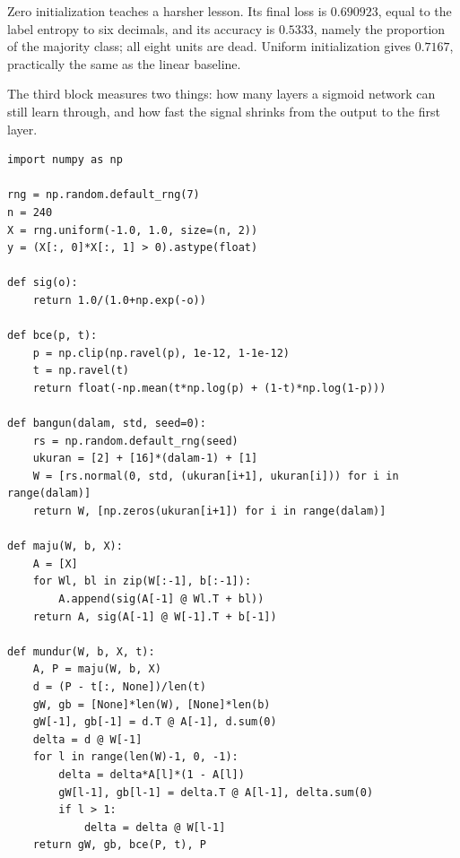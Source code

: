 Zero initialization teaches a harsher lesson. Its final loss is $0.690923$, equal to the label
entropy to six decimals, and its accuracy is $0.5333$, namely the proportion of the majority
class; all eight units are dead. Uniform initialization gives $0.7167$, practically the same as
the linear baseline.

The third block measures two things: how many layers a sigmoid network can still learn through,
and how fast the signal shrinks from the output to the first layer.

\begin{lab}
\begin{verbatim}
import numpy as np

rng = np.random.default_rng(7)
n = 240
X = rng.uniform(-1.0, 1.0, size=(n, 2))
y = (X[:, 0]*X[:, 1] > 0).astype(float)

def sig(o):
    return 1.0/(1.0+np.exp(-o))

def bce(p, t):
    p = np.clip(np.ravel(p), 1e-12, 1-1e-12)
    t = np.ravel(t)
    return float(-np.mean(t*np.log(p) + (1-t)*np.log(1-p)))

def bangun(dalam, std, seed=0):
    rs = np.random.default_rng(seed)
    ukuran = [2] + [16]*(dalam-1) + [1]
    W = [rs.normal(0, std, (ukuran[i+1], ukuran[i])) for i in range(dalam)]
    return W, [np.zeros(ukuran[i+1]) for i in range(dalam)]

def maju(W, b, X):
    A = [X]
    for Wl, bl in zip(W[:-1], b[:-1]):
        A.append(sig(A[-1] @ Wl.T + bl))
    return A, sig(A[-1] @ W[-1].T + b[-1])

def mundur(W, b, X, t):
    A, P = maju(W, b, X)
    d = (P - t[:, None])/len(t)
    gW, gb = [None]*len(W), [None]*len(b)
    gW[-1], gb[-1] = d.T @ A[-1], d.sum(0)
    delta = d @ W[-1]
    for l in range(len(W)-1, 0, -1):
        delta = delta*A[l]*(1 - A[l])
        gW[l-1], gb[l-1] = delta.T @ A[l-1], delta.sum(0)
        if l > 1:
            delta = delta @ W[l-1]
    return gW, gb, bce(P, t), P


\end{verbatim}
\end{lab}
